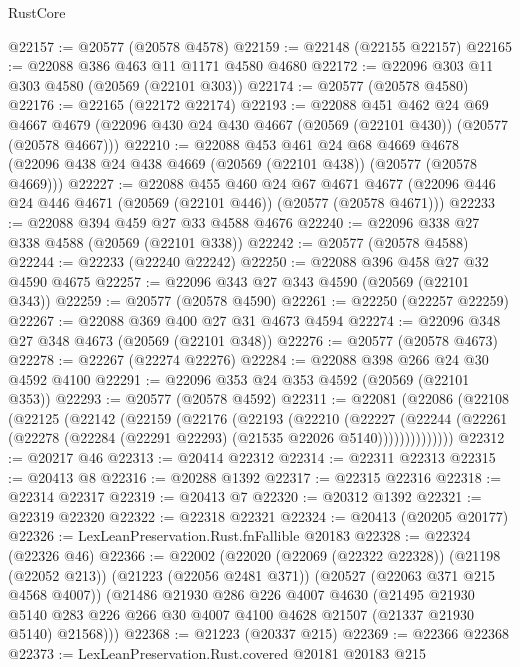 \begin{lexlean}{RustCore}
\begin{coremodule}
@22157 := @20577 (@20578 @4578)
@22159 := @22148 (@22155 @22157)
@22165 := @22088 @386 @463 @11 @1171 @4580 @4680
@22172 := @22096 @303 @11 @303 @4580 (@20569 (@22101 @303))
@22174 := @20577 (@20578 @4580)
@22176 := @22165 (@22172 @22174)
@22193 := @22088
    @451
    @462
    @24
    @69
    @4667
    @4679
    (@22096 @430 @24 @430 @4667 (@20569 (@22101 @430)) (@20577 (@20578 @4667)))
@22210 := @22088
    @453
    @461
    @24
    @68
    @4669
    @4678
    (@22096 @438 @24 @438 @4669 (@20569 (@22101 @438)) (@20577 (@20578 @4669)))
@22227 := @22088
    @455
    @460
    @24
    @67
    @4671
    @4677
    (@22096 @446 @24 @446 @4671 (@20569 (@22101 @446)) (@20577 (@20578 @4671)))
@22233 := @22088 @394 @459 @27 @33 @4588 @4676
@22240 := @22096 @338 @27 @338 @4588 (@20569 (@22101 @338))
@22242 := @20577 (@20578 @4588)
@22244 := @22233 (@22240 @22242)
@22250 := @22088 @396 @458 @27 @32 @4590 @4675
@22257 := @22096 @343 @27 @343 @4590 (@20569 (@22101 @343))
@22259 := @20577 (@20578 @4590)
@22261 := @22250 (@22257 @22259)
@22267 := @22088 @369 @400 @27 @31 @4673 @4594
@22274 := @22096 @348 @27 @348 @4673 (@20569 (@22101 @348))
@22276 := @20577 (@20578 @4673)
@22278 := @22267 (@22274 @22276)
@22284 := @22088 @398 @266 @24 @30 @4592 @4100
@22291 := @22096 @353 @24 @353 @4592 (@20569 (@22101 @353))
@22293 := @20577 (@20578 @4592)
@22311 := @22081
    (@22086
      (@22108
        (@22125
          (@22142
            (@22159
              (@22176
                (@22193
                  (@22210
                    (@22227
                      (@22244
                        (@22261 (@22278 (@22284 (@22291 @22293) (@21535 @22026 @5140))))))))))))))
@22312 := @20217 @46
@22313 := @20414 @22312
@22314 := @22311 @22313
@22315 := @20413 @8
@22316 := @20288 @1392
@22317 := @22315 @22316
@22318 := @22314 @22317
@22319 := @20413 @7
@22320 := @20312 @1392
@22321 := @22319 @22320
@22322 := @22318 @22321
@22324 := @20413 (@20205 @20177)
@22326 := LexLeanPreservation.Rust.fnFallible @20183
@22328 := @22324 (@22326 @46)
@22366 := @22002
    (@22020
      (@22069 (@22322 @22328))
      (@21198 (@22052 @213))
      (@21223 (@22056 @2481 @371))
      (@20527 (@22063 @371 @215 @4568 @4007))
      (@21486
        @21930
        @286
        @226
        @4007
        @4630
        (@21495
          @21930
          @5140
          @283
          @226
          @266
          @30
          @4007
          @4100
          @4628
          @21507
          (@21337 @21930 @5140)
          @21568)))
@22368 := @21223 (@20337 @215)
@22369 := @22366 @22368
@22373 := LexLeanPreservation.Rust.covered @20181 @20183 @215

\end{coremodule}
\end{lexlean}
